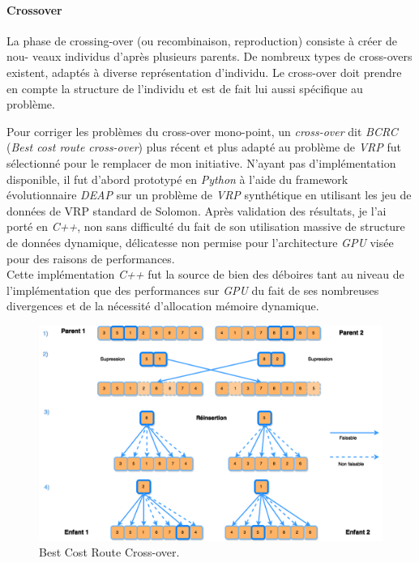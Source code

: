 \documentclass[12pt]{memoir}
\begin{document}
\paragraph{Crossover} %
\label{par:Crossover}
La phase de crossing-over (ou recombinaison, reproduction) consiste à créer de nou-
veaux individus d’après plusieurs parents. De nombreux types de cross-overs existent,
adaptés à diverse représentation d’individu. Le cross-over doit prendre en compte la
structure de l’individu et est de fait lui aussi spécifique au problème.

Pour corriger les problèmes du cross-over mono-point, un
\emph{cross-over} dit \textit{BCRC\cite{ombuki2006multi}} (\emph{Best cost route cross-over}) plus
récent et plus adapté au problème de \textit{ VRP} fut sélectionné pour le
remplacer de mon initiative. N'ayant pas d'implémentation disponible, il
fut d'abord prototypé en \textit{Python} à l'aide du framework évolutionnaire
\emph{DEAP} sur un problème de \emph{VRP} synthétique en utilisant les
jeu de données de VRP standard de Solomon\cite{solomon1987algorithms}. Après validation des
résultats, je l'ai porté en \textit{C++}, non sans difficulté du fait de
son utilisation massive de structure de données dynamique, délicatesse
non permise pour l'architecture \textit{GPU} visée pour des raisons de
performances. \\
Cette implémentation \emph{C++} fut la source de bien des
déboires tant au niveau de l'implémentation que des performances sur
\textit{GPU} du fait de ses nombreuses divergences et de la nécessité
d'allocation mémoire dynamique.

\begin{figure}[htbp]
	\begin{center}
		\includegraphics[width=6in]{img/BCRC.png}
		\caption{Best Cost Route Cross-over.}
	\end{center}
\end{figure}
\end{document}

